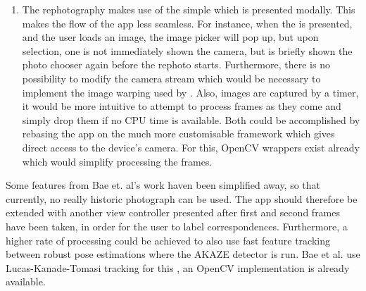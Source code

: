 \begin{enumerate}
   \item The rephotography makes use of the simple
       which is presented modally. This makes the
      flow of the app less seamless. For instance, when the
       is presented, and the user loads an image,
      the image picker will pop up, but upon selection, one is not immediately
      shown the camera, but is briefly shown the photo chooser again before the
      rephoto starts. Furthermore, there is no possibility to modify the camera
      stream which would be necessary to implement the image warping used by
      \citet{bae2010}. Also, images are captured by a timer, it would be more
      intuitive to attempt to process frames as they come and simply drop them
      if no CPU time is available. Both could be accomplished by rebasing the
      app on the much more customisable  framework which
      gives direct access to the device's camera. For this, OpenCV wrappers
      exist already which would simplify processing the frames.
\end{enumerate}

Some features from Bae et. al's work haven been simplified away, so that
currently, no really historic photograph can be used. The app should therefore
be extended with another view controller presented after first and second frames
have been taken, in order for the user to label correspondences. Furthermore,
a higher rate of processing could be achieved to also use fast feature tracking
between robust pose estimations where the AKAZE detector is run. Bae et al. use
Lucas-Kanade-Tomasi tracking for this \citep[see]{lucas1981,tomasi1991}, an
OpenCV implementation is already available. 
